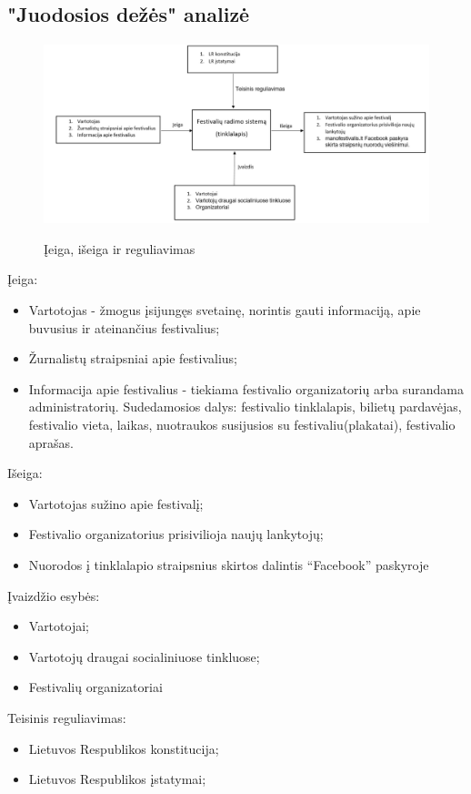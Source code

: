 \documentclass{VUMIFPSkursinis}
\begin{document}
\subsection{"Juodosios dežės" analizė}
\begin{figure}[H]
    \centering
    \includegraphics[scale=0.5]{img/geri/IsorineA}
    \label{img:uml0}
	\caption{Įeiga, išeiga ir reguliavimas}
\end{figure}
\noindent
Įeiga:
\begin{itemize}
\item Vartotojas - žmogus įsijungęs svetainę, norintis gauti informaciją, apie buvusius ir ateinančius festivalius;
\item Žurnalistų straipsniai apie festivalius;
\item Informacija apie festivalius - tiekiama festivalio organizatorių arba surandama administratorių. Sudedamosios dalys: festivalio tinklalapis, bilietų pardavėjas, festivalio vieta, laikas, nuotraukos susijusios su festivaliu(plakatai), festivalio aprašas.
\end{itemize}
Išeiga:
\begin{itemize}
\item Vartotojas sužino apie festivalį;
\item Festivalio organizatorius prisivilioja naujų lankytojų;
\item Nuorodos į tinklalapio straipsnius skirtos dalintis “Facebook” paskyroje
\end{itemize}
Įvaizdžio esybės:
\begin{itemize}
\item Vartotojai;
\item Vartotojų draugai socialiniuose tinkluose;
\item Festivalių organizatoriai
\end{itemize}
Teisinis reguliavimas:
\begin{itemize}
\item Lietuvos Respublikos konstitucija;
\item Lietuvos Respublikos įstatymai;
\end{itemize}
\end{document}
